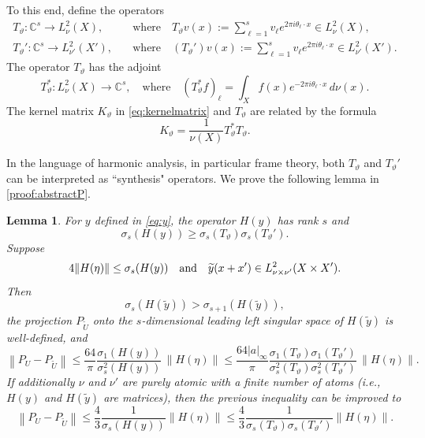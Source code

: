\documentclass[11pt]{article}
\newtheorem{lemma}[theorem]{Lemma}
\theoremstyle{definition}
\numberwithin{theorem}{section}
\numberwithin{lemma}{section}
\numberwithin{equation}{section}
\def\C{\mathbb{C}}
\renewcommand{\tilde}{\widetilde}
\newcommand{\sampset}{X}
\def\wherespace{\quad\text{where}\quad}
\newcommand{\norm}[1]{{\left\|#1\right\|}}
\numberwithin{equation}{section}
\begin{document}
To this end, define the operators
\begin{align}
	T_\vartheta\colon \C^s\to L^2_\nu(X), &\wherespace T_\vartheta v(x) := \sum_{\ell=1}^s v_\ell e^{2\pi i \theta_\ell\cdot x} \in L^2_\nu(X), \label{eq:synthesis1} \\
	T_\vartheta'\colon \C^s\to L^2_{\nu'}(X'), &\wherespace (T_\vartheta') v(x) := \sum_{\ell=1}^s v_\ell e^{2\pi i \theta_\ell\cdot x} \in L^2_{\nu'}(X'). \label{eq:synthesis2}
\end{align}
The operator $T_\vartheta$ has the adjoint 
$$
T_\vartheta^*
\colon L^2_\nu(\sampset)\to \C^s, \wherespace (T_\vartheta^*f)_\ell = \int_\sampset f(x) e^{-2\pi i \theta_\ell \cdot x}\, d\nu(x).
$$
The kernel matrix $K_\vartheta$ in \eqref{eq:kernelmatrix} and $T_\vartheta$ are related by the formula
\begin{equation}
	K_\vartheta = \frac 1 {\nu(X)}  T_\vartheta^* T_\vartheta.
	\label{eq:relationshipKT}
\end{equation}


In the language of harmonic analysis, in particular frame theory, both $T_\vartheta$ and $T_\vartheta'$ can be interpreted as ``synthesis" operators. We prove the following lemma  in \cref{proof:abstractP}.
\begin{lemma}
	\label{lem:abstractP}
	For $y$ defined in \eqref{eq:y}, the operator $H(y)$ has rank $s$ and 
	$$
	\sigma_s(H(y))
	\geq \sigma_s(T_{\vartheta}) \sigma_s(T_{\vartheta}').
	$$ 
	Suppose 
	\begin{equation}\label{eq:perturb}
	4\|H(\eta)\|\leq \sigma_s(H(y)) \quad\hbox{and}\quad \tilde y(x+x')\in L^2_{\nu\times \nu'}(X\times X'). 
	\end{equation} Then 
	$$
	\sigma_s(H(\tilde y))> \sigma_{s+1}(H(\tilde y)),
	$$ 
	the projection $P_{\tilde U}$ onto the $s$-dimensional leading left singular space of $H(\tilde y)$ is well-defined, and 
	$$
	\norm{P_U-P_{\tilde U}}
	\leq \frac {64}{\pi} \frac{\sigma_1(H(y))}{\sigma_s^2(H(y))} \, \|H(\eta)\|
	\leq \frac {64 |a|_\infty}{\pi} \frac{\sigma_1(T_\vartheta)\sigma_1(T_\vartheta')}{\sigma_s^2(T_\vartheta)\sigma_s^2(T_\vartheta')} \, \|H(\eta)\|.
	$$
	If additionally $\nu$ and $\nu'$ are purely atomic with a finite number of atoms (i.e., $H(y)$ and $H(\tilde y)$ are matrices), then the previous inequality can be improved to
	$$
	\norm{P_U-P_{\tilde U}}
	\leq \frac 43 \frac{1}{\sigma_s(H(y))} \|H(\eta)\|
	\leq \frac 43 \frac{1}{\sigma_s(T_{\vartheta}) \sigma_s(T_{\vartheta}')} \|H(\eta)\|.
	$$
\end{lemma}
\end{document}

